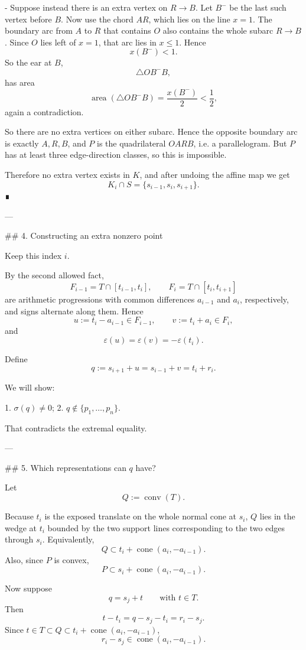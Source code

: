 - Suppose instead there is an extra vertex on \(R\to B\). Let \(B^-\) be the last such vertex before \(B\).  
  Now use the chord \(AR\), which lies on the line \(x=1\). The boundary arc from \(A\) to \(R\) that contains \(O\) also contains the whole subarc \(R\to B\). Since \(O\) lies left of \(x=1\), that arc lies in \(x\le 1\). Hence
  \[
  x(B^-)<1.
  \]
  So the ear at \(B\),
  \[
  \triangle OB^-B,
  \]
  has area
  \[
  \operatorname{area}(\triangle OB^-B)=\frac{x(B^-)}{2}<\frac12,
  \]
  again a contradiction.

So there are no extra vertices on either subarc. Hence the opposite boundary arc is exactly \(A,R,B\), and \(P\) is the quadrilateral \(OARB\), i.e. a parallelogram. But \(P\) has at least three edge-direction classes, so this is impossible.

Therefore no extra vertex exists in \(K\), and after undoing the affine map we get
\[
K_i\cap S=\{s_{i-1},s_i,s_{i+1}\}.
\]
∎

---

## 4. Constructing an extra nonzero point

Keep this index \(i\).

By the second allowed fact,
\[
F_{i-1}=T\cap[t_{i-1},t_i],\qquad
F_i=T\cap[t_i,t_{i+1}]
\]
are arithmetic progressions with common differences \(a_{i-1}\) and \(a_i\), respectively, and signs alternate along them. Hence
\[
u:=t_i-a_{i-1}\in F_{i-1},\qquad
v:=t_i+a_i\in F_i,
\]
and
\[
\varepsilon(u)=\varepsilon(v)=-\varepsilon(t_i).
\]

Define
\[
q:=s_{i+1}+u=s_{i-1}+v=t_i+r_i.
\]

We will show:

1. \(\sigma(q)\neq 0\);
2. \(q\notin\{p_1,\dots,p_n\}\).

That contradicts the extremal equality.

---

## 5. Which representations can \(q\) have?

Let
\[
Q:=\operatorname{conv}(T).
\]

Because \(t_i\) is the exposed translate on the whole normal cone at \(s_i\), \(Q\) lies in the wedge at \(t_i\) bounded by the two support lines corresponding to the two edges through \(s_i\). Equivalently,
\[
Q\subset t_i+\operatorname{cone}(a_i,-a_{i-1}).
\]
Also, since \(P\) is convex,
\[
P\subset s_i+\operatorname{cone}(a_i,-a_{i-1}).
\]

Now suppose
\[
q=s_j+t
\qquad\text{with }t\in T.
\]
Then
\[
t-t_i = q-s_j-t_i = r_i-s_j.
\]
Since \(t\in T\subset Q\subset t_i+\operatorname{cone}(a_i,-a_{i-1})\),
\[
r_i-s_j\in \operatorname{cone}(a_i,-a_{i-1}).
\]

